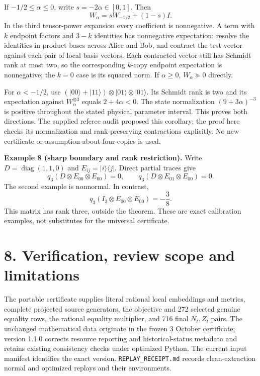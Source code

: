\documentclass[
  11pt,
]{article}
\begin{document}
If \(-1/2\leq\alpha\leq0\), write \(s=-2\alpha\in[0,1]\). Then \[
W_\alpha=sW_{-1/2}+(1-s)I.
\] In the third tensor-power expansion every coefficient is nonnegative.
A term with \(k\) endpoint factors and \(3-k\) identities has
nonnegative expectation: resolve the identities in product bases across
Alice and Bob, and contract the test vector against each pair of local
basis vectors. Each contracted vector still has Schmidt rank at most
two, so the corresponding \(k\)-copy endpoint expectation is
nonnegative; the \(k=0\) case is its squared norm. If \(\alpha\geq0\),
\(W_\alpha\succeq0\) directly.

For \(\alpha<-1/2\), use
\((|00\rangle+|11\rangle)\otimes|01\rangle\otimes|01\rangle\). Its
Schmidt rank is two and its expectation against \(W_\alpha^{\otimes3}\)
equals \(2+4\alpha<0\). The state normalization \((9+3\alpha)^{-3}\) is
positive throughout the stated physical parameter interval. This proves
both directions. The supplied referee audit proposed this corollary; the
proof here checks its normalization and rank-preserving contractions
explicitly. No new certificate or assumption about four copies is used.

\textbf{Example 8 (sharp boundary and rank restriction).} Write
\(D=\operatorname{diag}(1,1,0)\) and \(E_{ij}=|i\rangle\langle j|\).
Direct partial traces give \[
q_3(D\otimes E_{00}\otimes E_{00})=0,\qquad
q_3(D\otimes E_{01}\otimes E_{00})=0.
\] The second example is nonnormal. In contrast, \[
q_3(I_3\otimes E_{00}\otimes E_{00})=-\frac38.
\] This matrix has rank three, outside the theorem. These are exact
calibration examples, not substitutes for the universal certificate.

\section{8. Verification, review scope and
limitations}\label{verification-review-scope-and-limitations}

The portable certificate supplies literal rational local embeddings and
metrics, complete projected source generators, the objective and 272
selected genuine equality rows, the rational equality multiplier, and
716 final \(N_t,Z_t\) pairs. The unchanged mathematical data originate
in the frozen 3 October certificate; version 1.1.0 corrects resource
reporting and historical-status metadata and retains existing
consistency checks under optimized Python. The current input manifest
identifies the exact version. \texttt{REPLAY\_RECEIPT.md} records
clean-extraction normal and optimized replays and their environments.
\end{document}
